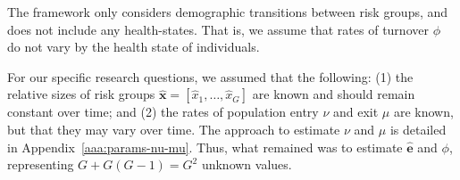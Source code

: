 The framework only considers demographic transitions between risk groups, and does not
include any health-states. That is, we assume that rates of turnover $\phi$
do not vary by the health state of individuals. 		%
\par
For our specific research questions,			%
we assumed that the following: (1) the relative sizes of risk groups		%
$\bm{\hat{x}} = [\hat{x}_1, \dots, \hat{x}_G]$
are known and should remain constant over time; and (2) 
the rates of population entry $\nu$ and exit $\mu$
are known, but that they may vary over time.
The approach to estimate $\nu$ and $\mu$ is detailed in Appendix~\ref{aaa:params-nu-mu}.
Thus, what remained was to estimate $\bm{\hat{e}}$ and $\phi$,
representing $G + G(G-1) = G^2$ unknown values.

